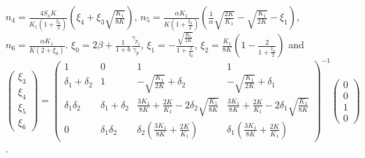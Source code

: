 \documentclass[notitlepage,dvips,rmp,fleqn,superscriptaddress,floatfix]{revtex4-1}
\begin{document}
\noindent $\displaystyle n_4 = \frac{4 S_a K}{K_1 \left(1+\frac{\xi_0}{2 }\right)} \left(\xi_4 + \xi_3 \sqrt{\frac{K_1}{8 K}}\right) $,
$\displaystyle n_5 = \frac{\alpha K_1}{K \left(1+\frac{\xi_0}{2 }\right)} \left(\frac{1}{\alpha}\sqrt{\frac{2 K}{K_1}}-\sqrt{\frac{K_1}{2 K}}-\xi_1\right) $,
$\displaystyle n_6 = \frac{\alpha K_1}{K \left(2+\xi_0\right)}$.
$\displaystyle \xi_0 = 2 \beta + \frac{1}{1+b}\frac{\gamma_{p_2}}{\gamma_{p}}$,
$\displaystyle \xi_1 = -\frac{\sqrt{\frac{K_1}{2 K}}}{1+\frac{2}{\xi_0}}$,
$\displaystyle \xi_2 = \frac{K_1}{8 K} \left(1 - \frac{2}{1 +\frac{\xi_0}{2 }} \right)$ and
$\displaystyle \begin{pmatrix}
  \xi_3  \\
  \xi_4  \\
  \xi_5  \\
  \xi_6 
 \end{pmatrix} =
 \begin{pmatrix}
  1& 0 & 1 & 1 \\
  \delta_1+ \delta_2& 1 & -\sqrt{\frac{K_1}{2 K}}+ \delta_2 &  -\sqrt{\frac{K_1}{2 K}}+\delta_1 \\
  \delta_1  \delta_2 & \delta_1+ \delta_2  & \frac{3K_1}{8 K}+\frac{2 K}{K_1}-2  \delta_2 \sqrt{\frac{K_1}{8 K}} &  \frac{3K_1}{8 K}+\frac{2 K}{K_1}-2 \delta_1 \sqrt{\frac{K_1}{8 K}} \\
  0 &  \delta_1  \delta_2 &  \delta_2 \left(\frac{3K_1}{8 K}+\frac{2 K}{K_1}\right) & \delta_1 \left(\frac{3K_1}{8 K}+\frac{2 K}{K_1}\right) 
 \end{pmatrix}^{-1} \begin{pmatrix}
  0 \\
 0  \\
 1  \\
  0
 \end{pmatrix} $.
%
\end{document}
